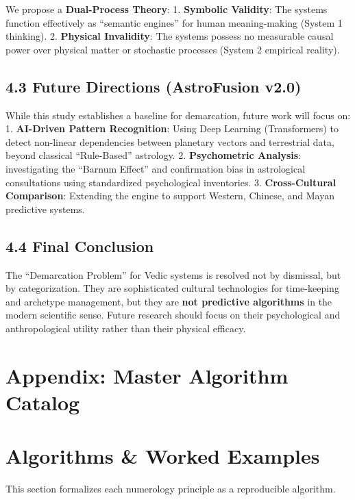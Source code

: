 \documentclass[
  11pt,
  a4paper,
  oneside,
  openany]{report}
\begin{document}
We propose a \textbf{Dual-Process Theory}: 1. \textbf{Symbolic
Validity}: The systems function effectively as ``semantic engines'' for
human meaning-making (System 1 thinking). 2. \textbf{Physical
Invalidity}: The systems possess no measurable causal power over
physical matter or stochastic processes (System 2 empirical reality).

\section{4.3 Future Directions (AstroFusion
v2.0)}\label{future-directions-astrofusion-v2.0}

While this study establishes a baseline for demarcation, future work
will focus on: 1. \textbf{AI-Driven Pattern Recognition}: Using Deep
Learning (Transformers) to detect non-linear dependencies between
planetary vectors and terrestrial data, beyond classical ``Rule-Based''
astrology. 2. \textbf{Psychometric Analysis}: investigating the ``Barnum
Effect'' and confirmation bias in astrological consultations using
standardized psychological inventories. 3. \textbf{Cross-Cultural
Comparison}: Extending the engine to support Western, Chinese, and Mayan
predictive systems.

\section{4.4 Final Conclusion}\label{final-conclusion}

The ``Demarcation Problem'' for Vedic systems is resolved not by
dismissal, but by categorization. They are sophisticated cultural
technologies for time-keeping and archetype management, but they are
\textbf{not predictive algorithms} in the modern scientific sense.
Future research should focus on their psychological and anthropological
utility rather than their physical efficacy.

\newpage

\chapter{Appendix: Master Algorithm
Catalog}\label{appendix-master-algorithm-catalog}

\chapter{Algorithms \& Worked
Examples}\label{algorithms-worked-examples}

This section formalizes each numerology principle as a reproducible
algorithm.
\end{document}
